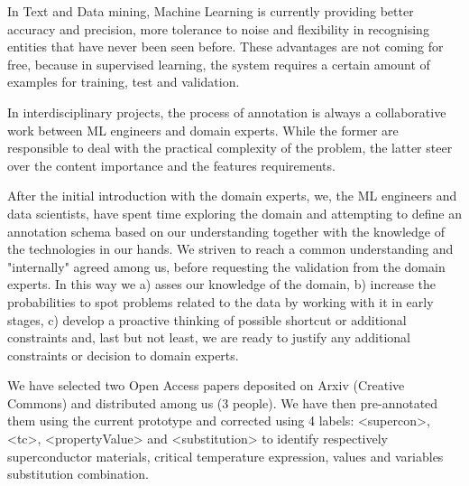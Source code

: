 \documentclass{article}
\begin{document}
In Text and Data mining, Machine Learning is currently providing better accuracy and precision, more tolerance to noise and flexibility in recognising entities that have never been seen before. These advantages are not coming for free, because in supervised learning, the system requires a certain amount of examples for training, test and validation. 


In interdisciplinary projects, the process of annotation is always a collaborative work between ML engineers and domain experts. While the former are responsible to deal with the practical complexity of the problem, the latter steer over the content importance and the features requirements. 

After the initial introduction with the domain experts, we, the ML engineers and data scientists, have spent time exploring the domain and attempting to define an annotation schema based on our understanding together with the knowledge of the technologies in our hands. We striven to reach a common understanding and "internally" agreed among us, before requesting the validation from the domain experts. 
In this way we a) asses our knowledge of the domain, b) increase the probabilities to spot problems related to the data by working with it in early stages, c) develop a proactive thinking of possible shortcut or additional constraints and, last but not least, we are ready to justify any additional constraints or decision to domain experts. 

We have selected two Open Access papers deposited on Arxiv (Creative Commons) and distributed among us (3 people). We have then pre-annotated them using the current prototype and corrected using 4 labels: <supercon>, <tc>, <propertyValue> and <substitution> to identify respectively superconductor materials, critical temperature expression, values and variables substitution combination. 
\end{document}
